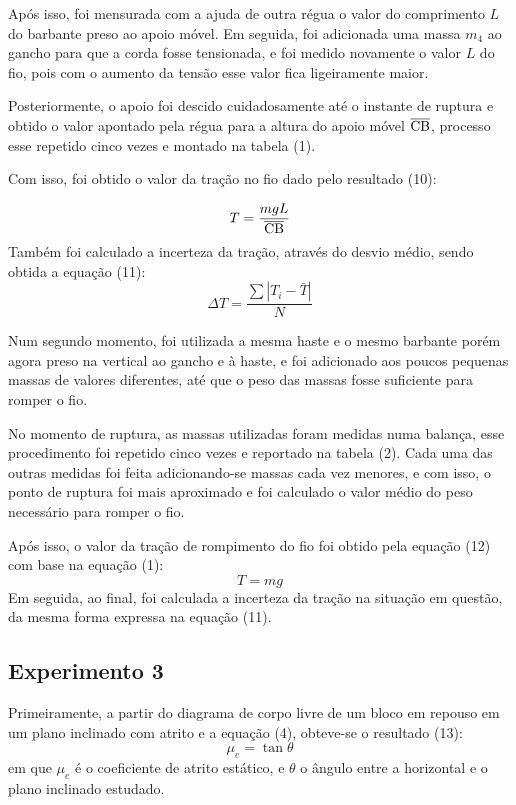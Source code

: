 \documentclass[12pt, letterpaper]{article}
\begin{document}
    Após isso, foi mensurada com a ajuda de outra régua o valor do comprimento $L$ do barbante preso ao apoio móvel. Em seguida, foi adicionada uma massa $m_{4}$ ao gancho para que a corda fosse tensionada, e foi medido novamente o valor $L$ do fio, pois com o aumento da tensão esse valor fica ligeiramente maior.

    Posteriormente, o apoio foi descido cuidadosamente até o instante de ruptura e obtido o valor apontado pela régua para a altura do apoio móvel $\overline{\rm CB}$, processo esse repetido cinco vezes e montado na tabela (1).

    Com isso, foi obtido o valor da tração no fio dado pelo resultado (10):

    
    
    \begin{equation}
        T = \frac{mgL}{\overline{\rm CB}}
    \end{equation}
    Também foi calculado a incerteza da tração, através do desvio médio, sendo obtida a equação (11):
    \begin{equation}
        \Delta T = \frac{\sum |T_{i} - \bar T|}{N}
    \end{equation}

    Num segundo momento, foi utilizada a mesma haste e o mesmo barbante porém agora preso na vertical ao gancho e à haste, e foi adicionado aos poucos pequenas massas de valores diferentes, até que o peso das massas fosse suficiente para romper o fio.

    No momento de ruptura, as massas utilizadas foram medidas numa balança, esse procedimento foi repetido cinco vezes e reportado na tabela (2). Cada uma das outras medidas foi feita adicionando-se massas cada vez menores, e com isso, o ponto de ruptura foi mais aproximado e foi calculado o valor médio do peso necessário para romper o fio.

    Após isso, o valor da tração de rompimento do fio foi obtido pela equação (12) com base na equação (1):
    \begin{equation}
        T = mg
    \end{equation}
    Em seguida, ao final, foi calculada a incerteza da tração na situação em questão, da mesma forma expressa na equação (11).
\subsection{Experimento 3}
Primeiramente, a partir do diagrama de corpo livre de um bloco em repouso em um plano inclinado com atrito e a equação (4), obteve-se o resultado (13):
\begin{equation}
\mu_e = \tan{\theta}
\end{equation}
em que $\mu_e$ é o coeficiente de atrito estático, e $\theta$ o ângulo entre  a horizontal e o plano inclinado estudado.
\end{document}
